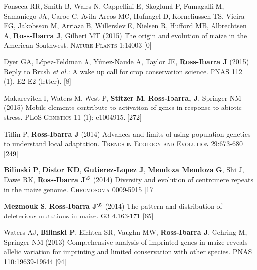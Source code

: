 \documentclass[letterpaper,10pt]{article}
\begin{document}
\begin{etaremune}
\item Fonseca RR, Smith B, Wales N, Cappellini E, Skoglund P, Fumagalli M, Samaniego JA, Caroe C, Avila-Arcos MC, Hufnagel D, Korneliussen TS, Vieira FG, Jakobsson M, Arriaza B, Willerslev E, Nielsen R, Hufford MB, Albrechtsen A,  {\bf Ross-Ibarra J}, Gilbert MT (2015) The origin and evolution of maize in the American Southwest. \textsc{Nature Plants} 1:14003
 [0]\\

\item Dyer GA, L\'opez-Feldman A, Y\'unez-Naude A, Taylor JE, {\bf Ross-Ibarra J} (2015) Reply to Brush \emph{et al.}: A wake up call for crop conservation science. PNAS 112 (1), E2-E2 (letter).
 [8]\\


\item Makarevitch I, Waters M, West P, {\bf Stitzer M}, {\bf Ross-Ibarra, J}, Springer NM (2015) Mobile elements contribute to activation of genes in response to abiotic stress. \textsc{PLoS Genetics} 11 (1): e1004915. %
 [272]\\


\item Tiffin P, {\bf Ross-Ibarra J} (2014) Advances and limits of using population genetics to understand local adaptation. \textsc{Trends in Ecology and Evolution} 29:673-680 %
 [249]\\


\item {\bf Bilinski P}, {\bf Distor KD}, {\bf Gutierez-Lopez J}, {\bf Mendoza Mendoza G}, Shi J, Dawe RK,  {\bf Ross-Ibarra J}$^\S$ (2014) Diversity and evolution of centromere repeats in the maize genome. \textsc{Chromosoma} 0009-5915
 [17]\\

\item {\bf Mezmouk S}, {\bf Ross-Ibarra J}$^\S$ (2014) The pattern and distribution of deleterious mutations in maize. \textsc{G3} 4:163-171
 [65]\\

\item Waters AJ, {\bf Bilinski P}, Eichten SR, Vaughn MW, {\bf Ross-Ibarra J}, Gehring M, Springer NM (2013) Comprehensive analysis of imprinted genes in maize reveals allelic variation for imprinting and limited conservation with other species. \textsc{PNAS} 110:19639-19644
 [94]\\



\end{etaremune}
\end{document}
